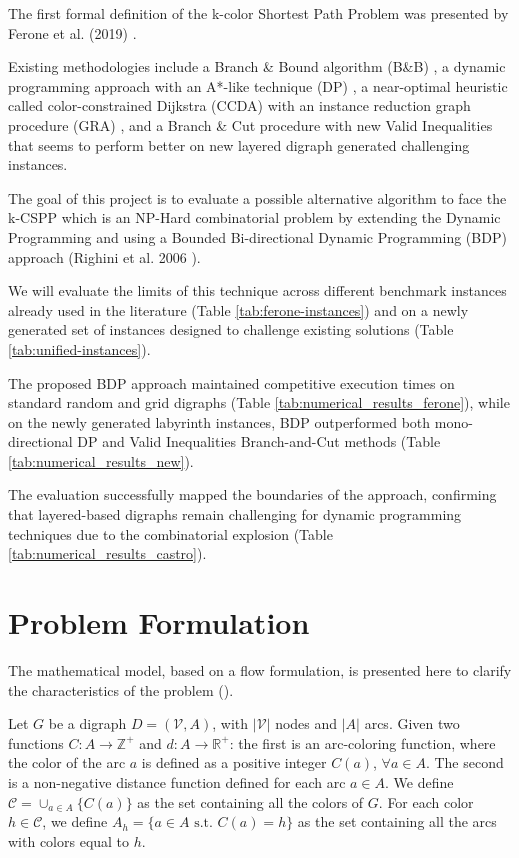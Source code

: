 \documentclass[pdflatex,sn-mathphys-num]{sn-jnl}
\begin{document}
The first formal definition of the k-color Shortest Path Problem was presented by Ferone et al. (2019) \cite{Ferone2019}.

Existing methodologies include a Branch \& Bound algorithm (B\&B) \cite{Ferone2019}, a dynamic programming approach with an A*-like technique (DP) \cite{Ferone2021}, 
a near-optimal heuristic called color-constrained Dijkstra (CCDA) with an instance reduction graph procedure (GRA) \cite{CerroneRusso2023}, 
and a Branch \& Cut procedure with new Valid Inequalities \cite{Castro2024} that seems to perform better on new layered digraph generated challenging instances.

The goal of this project is to evaluate a possible alternative algorithm to face the k-CSPP which is an NP-Hard combinatorial problem 
by extending the Dynamic Programming and using a Bounded Bi-directional Dynamic Programming (BDP) approach (Righini et al. 2006 \cite{righini2006}). 

We will evaluate the limits of this technique across different benchmark instances already used in the literature (Table \ref{tab:ferone-instances}) and
on a newly generated set of instances designed to challenge existing solutions (Table \ref{tab:unified-instances}).

The proposed BDP approach maintained competitive execution times on standard random and grid digraphs (Table \ref{tab:numerical_results_ferone}), 
while on the newly generated labyrinth instances, BDP outperformed both mono-directional DP and Valid Inequalities Branch-and-Cut methods (Table \ref{tab:numerical_results_new}).  

The evaluation successfully mapped the boundaries of the approach, confirming that layered-based digraphs remain 
challenging for dynamic programming techniques due to the combinatorial explosion (Table \ref{tab:numerical_results_castro}).

\section{Problem Formulation}

The mathematical model, based on a flow formulation, is presented here to clarify the characteristics of the problem (\cite{Ferone2019}). 

Let $G$ be a digraph $D = (\mathcal{V}, A)$, with $|\mathcal{V}|$ nodes and $|A|$ arcs. Given two functions $C : A \to \mathbb{Z}^+$ and
$d : A \to \mathbb{R}^+$: the first is an arc-coloring function,
where the color of the arc $a$ is defined as a positive integer $C(a)$, $\forall a \in A$. 
The second is a non-negative distance function defined for each arc $a \in A$. 
We define $\mathcal{C}= \cup_{a \in A} \{C(a)\}$ as the set containing all the colors
of $G$. For each color $h \in \mathcal{C}$, we define $A_h = \{a \in A \text{ s.t. } C(a) = h\}$ as the
set containing all the arcs with colors equal to $h$.
\end{document}
